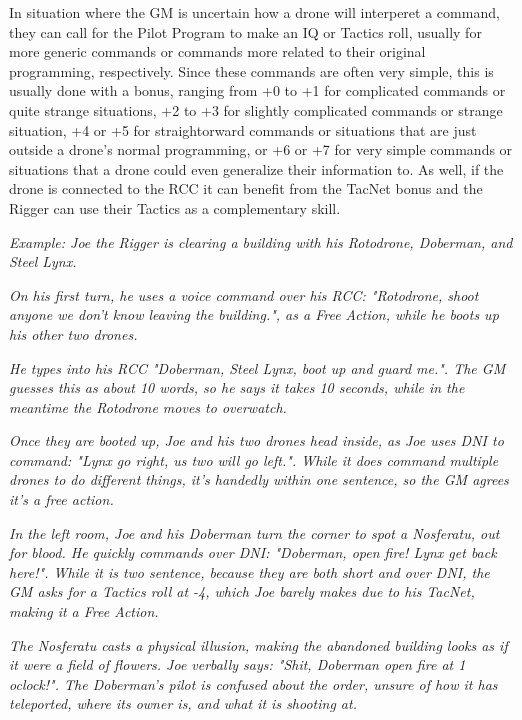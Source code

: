 \begin{multicols*}{3}
	In situation where the GM is uncertain how a drone will interperet a command, they can call for the Pilot Program to make an IQ or Tactics roll, usually for more generic commands or commands more related to their original programming, respectively. Since these commands are often very simple, this is usually done with a bonus, ranging from +0 to +1 for complicated commands or quite strange situations, +2 to +3 for slightly complicated commands or strange situation, +4 or +5 for straightorward commands or situations that are just outside a drone's normal programming, or +6 or +7 for very simple commands or situations that a drone could even generalize their information to. As well, if the drone is connected to the RCC it can benefit from the TacNet bonus and the Rigger can use their Tactics as a complementary skill.
	
	\textcolor{OliveGreen}{\textit{Example: Joe the Rigger is clearing a building with his Rotodrone, Doberman, and Steel Lynx.}}
	
	\textcolor{OliveGreen}{\textit{On his first turn, he uses a voice command over his RCC: "Rotodrone, shoot anyone we don't know leaving the building.", as a Free Action, while he boots up his other two drones.}}
	
	\textcolor{OliveGreen}{\textit{He types into his RCC "Doberman, Steel Lynx, boot up and guard me.". The GM guesses this as about 10 words, so he says it takes 10 seconds, while in the meantime the Rotodrone moves to overwatch.}}
	
	\textcolor{OliveGreen}{\textit{Once they are booted up, Joe and his two drones head inside, as Joe uses DNI to command: "Lynx go right, us two will go left.". While it does command multiple drones to do different things, it's handedly within one sentence, so the GM agrees it's a free action.}}
	
	\textcolor{OliveGreen}{\textit{In the left room, Joe and his Doberman turn the corner to spot a Nosferatu, out for blood. He quickly commands over DNI: "Doberman, open fire! Lynx get back here!". While it is two sentence, because they are both short and over DNI, the GM asks for a Tactics roll at -4, which Joe barely makes due to his TacNet, making it a Free Action.}}
	
	\textcolor{OliveGreen}{\textit{The Nosferatu casts a physical illusion, making the abandoned building looks as if it were a field of flowers. Joe verbally says: "Shit, Doberman open fire at 1 oclock!". The Doberman's pilot is confused about the order, unsure of how it has teleported, where its owner is, and what it is shooting at.}}
	

\end{multicols*}
